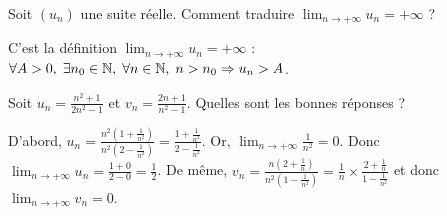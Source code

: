 \begin{question}
Soit $(u_n)$ une suite réelle. Comment traduire $\displaystyle \lim _{n\to +\infty}u_n=+\infty$ ?
\begin{answers}  
\end{answers}
\begin{explanations}
C'est la définition $\displaystyle \lim _{n\to +\infty}u_n=+\infty$ : $\forall A>0,\; \exists n_0\in \mathbb{N},\; \forall n\in \mathbb{N},\; n>n_0\Rightarrow u_n>A$.
\end{explanations}
\end{question}



\begin{question}
Soit $\displaystyle u_n=\frac{n^2+1}{2n^2-1}$ et $\displaystyle v_n=\frac{2n+1}{n^2-1}$. Quelles sont les bonnes réponses ?
\begin{answers}  
\end{answers}
\begin{explanations}
D'abord, $\displaystyle u_n=\frac{n^2\left(1+\frac{1}{n^2}\right)}{n^2\left(2-\frac{1}{n^2}\right)}=\frac{1+\frac{1}{n^2}}{2-\frac{1}{n^2}}$. Or, $\displaystyle \lim _{n\to +\infty}\frac{1}{n^2}=0$. Donc $\displaystyle \lim _{n\to +\infty}u_n=\frac{1+0}{2-0}=\frac{1}{2}$. De même, $\displaystyle v_n=\frac{n\left(2+\frac{1}{n}\right)}{n^2\left(1-\frac{1}{n^2}\right)}=\frac{1}{n}\times\frac{2+\frac{1}{n}}{1-\frac{1}{n^2}}$ et donc $\displaystyle \lim _{n\to +\infty}v_n=0$.
\end{explanations}
\end{question}




